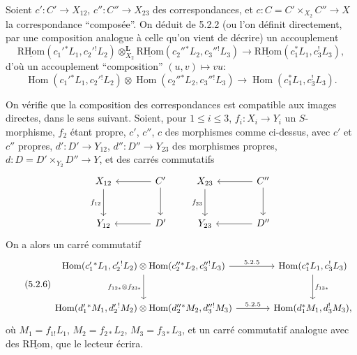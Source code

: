 \documentclass[11pt]{article}
\DeclareMathOperator{\Hom}{Hom}
\newcommand{\R}{\mathrm{R}}\newcommand{\RHomCore}{\mathrm{RHom}}
\providecommand{\RHom}{\RHomCore}
\providecommand{\uRHom}{\underline{\RHom}}
\providecommand{\RHom}{\RHomCore}
\providecommand{\Hom}{\operatorname{Hom}}
\providecommand{\RHom}{\R\mathcal{H}om}
\providecommand{\R}{\mathrm R}
\providecommand{\RHom}{\RHomCore}
\providecommand{\Hom}{\operatorname{Hom}}
\begin{document}
Soient $c':C'\to X_{12}$, $c'':C''\to X_{23}$ des correspondances, et $c:C=C'\times_{X_2}C''\to X$ la correspondance ``composée''. On déduit de 5.2.2 (ou l'on définit directement, par une composition analogue à celle qu'on vient de décrire) un accouplement
\begin{equation}
\tag{5.2.4}
\uRHom(c_1'{}^*L_1,c_2'{}^!L_2)\otimes_{X_2}^{\mathbf L}\uRHom(c_2''{}^*L_2,c_3''{}^!L_3)
\longrightarrow\uRHom(c_1^*L_1,c_3^!L_3),
\end{equation}
d'où un accouplement ``composition'' $(u,v)\mapsto vu$:
\begin{equation}
\tag{5.2.5}
\Hom(c_1'{}^*L_1,c_2'{}^!L_2)\otimes\Hom(c_2''{}^*L_2,c_3''{}^!L_3)
\longrightarrow\Hom(c_1^*L_1,c_3^!L_3).
\end{equation}

On vérifie que la composition des correspondances est compatible aux images directes, dans le sens suivant. Soient, pour $1\leq i\leq 3$, $f_i:X_i\to Y_i$ un $S$-morphisme, $f_2$ étant propre, $c'$, $c''$, $c$ des morphismes comme ci-dessus, avec $c'$ et $c''$ propres, $d':D'\to Y_{12}$, $d'':D''\to Y_{23}$ des morphismes propres, $d:D=D'\times_{Y_2}D''\to Y$, et des carrés commutatifs
\[
\begin{tikzcd}[column sep=large,row sep=large]
X_{12} \arrow[d,"f_{12}"'] & C' \arrow[l] \arrow[d] \\
Y_{12} & D' \arrow[l]
\end{tikzcd}
\qquad
\begin{tikzcd}[column sep=large,row sep=large]
X_{23} \arrow[d,"f_{23}"'] & C'' \arrow[l] \arrow[d] \\
Y_{23} & D'' \arrow[l]
\end{tikzcd}
\]
On a alors un carré commutatif
\begin{equation}
\tag{5.2.6}
\begin{tikzcd}[column sep=large,row sep=large]
\Hom(c_1'{}^*L_1,c_2'{}^!L_2)\otimes\Hom(c_2''{}^*L_2,c_3''{}^!L_3) \arrow[r,"5.2.5"] \arrow[d,"f_{12*}\otimes f_{23*}"']
& \Hom(c_1^*L_1,c_3^!L_3) \arrow[d,"f_{13*}"] \\
\Hom(d_1'{}^*M_1,d_2'{}^!M_2)\otimes\Hom(d_2''{}^*M_2,d_3''{}^!M_3) \arrow[r,"5.2.5"]
& \Hom(d_1^*M_1,d_3^!M_3),
\end{tikzcd}
\end{equation}
où $M_1=f_{1!}L_1$, $M_2=f_{2*}L_2$, $M_3=f_{3*}L_3$, et un carré commutatif analogue avec des $\uRHom$, que le lecteur écrira.
\end{document}
